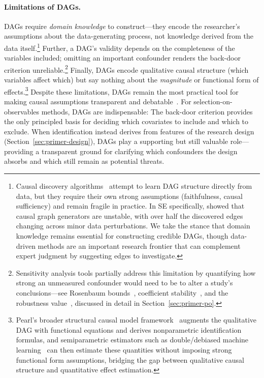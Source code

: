 \paragraph{Limitations of DAGs.}
DAGs require \emph{domain knowledge} to construct---they encode the researcher's assumptions about the data-generating process, not knowledge derived from the data itself.\footnote{Causal discovery algorithms~\cite{spirtes2001causation} attempt to learn DAG structure directly from data, but they require their own strong assumptions (faithfulness, causal sufficiency) and remain fragile in practice.
In SE specifically, \citet{journals/ese/HulseEM25} showed that causal graph generators are unstable, with over half the discovered edges changing across minor data perturbations.
We take the stance that domain knowledge remains essential for constructing credible DAGs, though data-driven methods are an important research frontier that can complement expert judgment by suggesting edges to investigate.}
Further, a DAG's validity depends on the completeness of the variables included; omitting an important confounder renders the back-door criterion unreliable.\footnote{Sensitivity analysis tools partially address this limitation by quantifying how strong an unmeasured confounder would need to be to alter a study's conclusions---see Rosenbaum bounds~\cite{rosenbaum2002observational}, coefficient stability~\cite{oster2019unobservable}, and the robustness value~\cite{cinelli2020making}, discussed in detail in Section~\ref{sec:primer-po}.}
Finally, DAGs encode qualitative causal structure (which variables affect which) but say nothing about the \emph{magnitude} or functional form of effects.\footnote{Pearl's broader structural causal model framework~\cite{pearl2009causality} augments the qualitative DAG with functional equations and derives nonparametric identification formulas, and semiparametric estimators such as double/debiased machine learning~\cite{chernozhukov2018double} can then estimate these quantities without imposing strong functional form assumptions, bridging the gap between qualitative causal structure and quantitative effect estimation.}
Despite these limitations, DAGs remain the most practical tool for making causal assumptions transparent and debatable~\cite{rohrer2018thinking, tennant2021dags}.
For selection-on-observables methods, DAGs are indispensable: The back-door criterion provides the only principled basis for deciding which covariates to include and which to exclude.
When identification instead derives from features of the research design (Section~\ref{sec:primer-design}), DAGs play a supporting but still valuable role---providing a transparent ground for clarifying which confounders the design absorbs and which still remain as potential threats.

